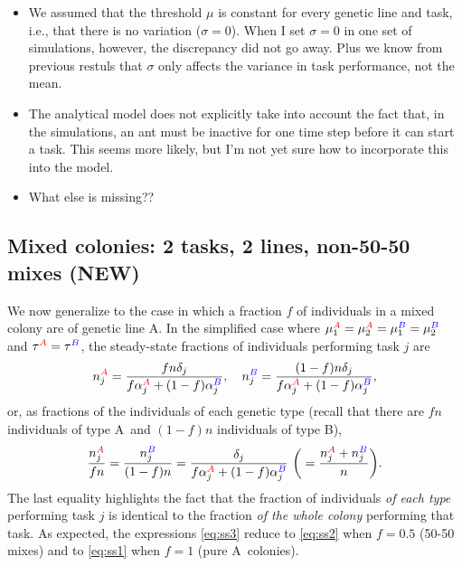 \documentclass[10pt]{article}
\theoremstyle{remark}
\newcommand{\A}{{\color{red}A}}
\newcommand{\B}{{\color{blue}B}}
\begin{document}
\begin{itemize}
    \item We assumed that the threshold $\mu$ is constant for every genetic line and task, i.e., that there is no variation ($\sigma = 0$). {\color{orange}When I set $\sigma = 0$ in one set of simulations, however, the discrepancy did not go away. Plus we know from previous restuls that $\sigma$ only affects the variance in task performance, not the mean.}
    
    \item The analytical model does not explicitly take into account the fact that, in the simulations, an ant must be inactive for one time step before it can start a task. {\color{orange}This seems more likely, but I'm not yet sure how to incorporate this into the model.}
    
    \item {\color{orange}What else is missing??}
    
\end{itemize}

\subsection{Mixed colonies: 2 tasks, 2 lines, non-50-50 mixes (NEW)}

We now generalize to the case in which a fraction $f$ of individuals in a mixed colony are of genetic line \A. In the simplified case where $\mu_1^{\A} = \mu_2^{\A} = \mu_1^{\B} = \mu_2^{\B}$ and $\tau^{\A} = \tau^{\B}$, the steady-state fractions of individuals performing task $j$ are
\begin{equation}
     n_j^{\A} =  \frac{fn\delta_j}{f\alpha_j^{\A} + (1-f)\alpha_j^{\B}}, 
     \quad
     n_j^{\B} =  \frac{(1-f)n\delta_j}{f\alpha_j^{\A} + (1-f)\alpha_j^{\B}}, 
     \label{eq:ss3a}
\end{equation}
or, as fractions of the individuals of each genetic type (recall that there are $fn$ individuals of type \A\ and $(1-f)n$ individuals of type \B),
\begin{equation}
     \frac{n_j^{\A}}{fn} =  \frac{n_j^{\B}}{(1-f)n} = \frac{\delta_j}{f\alpha_j^{\A} + (1-f)\alpha_j^{\B}} \ \bigg(= \frac{n_j^{\A} + n_j^{\B}}{n}\bigg). \label{eq:ss3}
\end{equation}
The last equality highlights the fact that the fraction of individuals \textit{of each type} performing task $j$ is identical to the fraction \textit{of the whole colony} performing that task. As expected, the expressions \eqref{eq:ss3} reduce to \eqref{eq:ss2} when $f=0.5$ (50-50 mixes) and to \eqref{eq:ss1} when $f=1$ (pure \A\ colonies).
\end{document}
